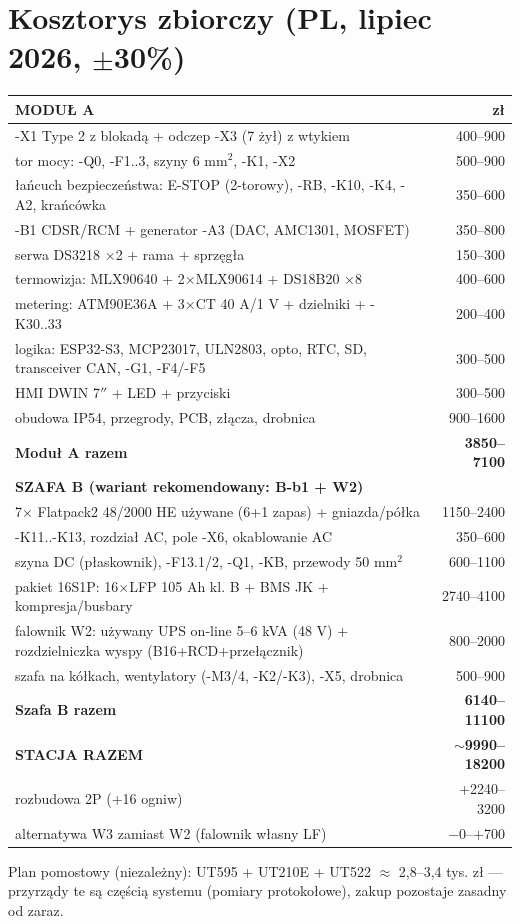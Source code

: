 \documentclass[11pt,a4paper]{article}
\begin{document}
\section{Kosztorys zbiorczy (PL, lipiec 2026, $\pm$30\%)}
\begin{longtable}{@{}p{}r@{}}
\toprule
\textbf{MODUŁ A} & \textbf{zł}\\
\midrule
-X1 Type 2 z blokadą + odczep -X3 (7 żył) z wtykiem & 400--900\\
tor mocy: -Q0, -F1..3, szyny 6 mm$^2$, -K1, -X2 & 500--900\\
łańcuch bezpieczeństwa: E-STOP (2-torowy), -RB, -K10, -K4, -A2, krańcówka & 350--600\\
-B1 CDSR/RCM + generator -A3 (DAC, AMC1301, MOSFET) & 350--800\\
serwa DS3218 $\times$2 + rama + sprzęgła & 150--300\\
termowizja: MLX90640 + 2$\times$MLX90614 + DS18B20 $\times$8 & 400--600\\
metering: ATM90E36A + 3$\times$CT 40 A/1 V + dzielniki + -K30..33 & 200--400\\
logika: ESP32-S3, MCP23017, ULN2803, opto, RTC, SD, transceiver CAN, -G1, -F4/-F5 & 300--500\\
HMI DWIN 7$''$ + LED + przyciski & 300--500\\
obudowa IP54, przegrody, PCB, złącza, drobnica & 900--1600\\
\midrule
\textbf{Moduł A razem} & \textbf{3850--7100}\\
\midrule
\textbf{SZAFA B (wariant rekomendowany: B-b1 + W2)} & \\
\midrule
7$\times$ Flatpack2 48/2000 HE używane (6+1 zapas) + gniazda/półka & 1150--2400\\
-K11..-K13, rozdział AC, pole -X6, okablowanie AC & 350--600\\
szyna DC (płaskownik), -F13.1/2, -Q1, -KB, przewody 50 mm$^2$ & 600--1100\\
pakiet 16S1P: 16$\times$LFP 105 Ah kl. B + BMS JK + kompresja/busbary & 2740--4100\\
falownik W2: używany UPS on-line 5--6 kVA (48 V) + rozdzielniczka wyspy (B16+RCD+przełącznik) & 800--2000\\
szafa na kółkach, wentylatory (-M3/4, -K2/-K3), -X5, drobnica & 500--900\\
\midrule
\textbf{Szafa B razem} & \textbf{6140--11100}\\
\textbf{STACJA RAZEM} & \textbf{$\sim$9990--18200}\\
\quad rozbudowa 2P (+16 ogniw) & +2240--3200\\
\quad alternatywa W3 zamiast W2 (falownik własny LF) & $-$0--$+$700\\
\bottomrule
\end{longtable}
Plan pomostowy (niezależny): UT595 + UT210E + UT522 $\approx$ 2,8--3,4 tys. zł --- przyrządy te są
częścią systemu (pomiary protokołowe), zakup pozostaje zasadny od zaraz.
\end{document}
